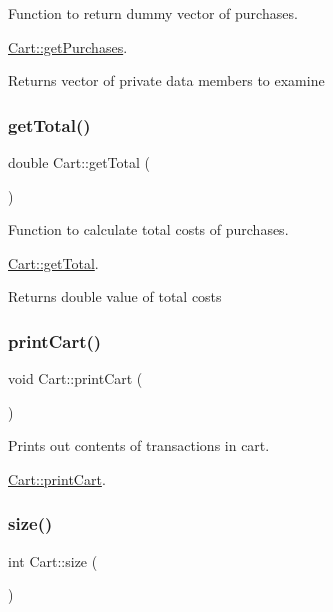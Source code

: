 Function to return dummy vector of purchases. 

\mbox{\hyperlink{class_cart_a3d7b1086c3a0ee0e9ae9c004f80fbc69}{Cart\+::get\+Purchases}}.

\begin{DoxyReturn}{Returns}
vector of private data members to examine 
\end{DoxyReturn}
\mbox{\label{class_cart_a86b4dda9ec906b2949248ce1085285e1}} 
\subsubsection{\texorpdfstring{get\+Total()}{getTotal()}}
{\footnotesize\ttfamily double Cart\+::get\+Total (\begin{DoxyParamCaption}{ }\end{DoxyParamCaption})}



Function to calculate total costs of purchases. 

\mbox{\hyperlink{class_cart_a86b4dda9ec906b2949248ce1085285e1}{Cart\+::get\+Total}}.

\begin{DoxyReturn}{Returns}
double value of total costs 
\end{DoxyReturn}
\mbox{\label{class_cart_aa85e6745516afcd9b46fac6397aa5439}} 
\subsubsection{\texorpdfstring{print\+Cart()}{printCart()}}
{\footnotesize\ttfamily void Cart\+::print\+Cart (\begin{DoxyParamCaption}{ }\end{DoxyParamCaption})}



Prints out contents of transactions in cart. 

\mbox{\hyperlink{class_cart_aa85e6745516afcd9b46fac6397aa5439}{Cart\+::print\+Cart}}. \mbox{\label{class_cart_ac89333c3766ab987cad13fc430407b78}} 
\subsubsection{\texorpdfstring{size()}{size()}}
{\footnotesize\ttfamily int Cart\+::size (\begin{DoxyParamCaption}{ }\end{DoxyParamCaption})}



